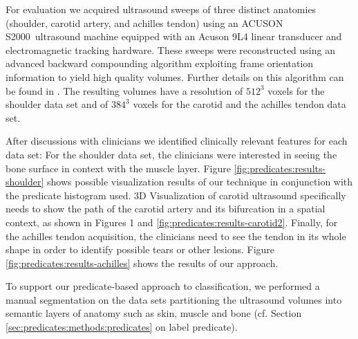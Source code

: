 For evaluation we acquired ultrasound sweeps of three distinct anatomies (shoulder, carotid artery, and achilles tendon) using an ACUSON S2000\texttrademark~ultrasound machine equipped with an Acuson 9L4 linear transducer and electromagnetic tracking hardware. 
These sweeps were reconstructed using an advanced backward compounding algorithm exploiting frame orientation information to yield high quality volumes. 
Further details on this algorithm can be found in \cite{SzB14}.
The resulting volumes have a resolution of $512^3$ voxels for the shoulder data set and of $384^3$ voxels for the carotid and the achilles tendon data set.


After discussions with clinicians we identified clinically relevant features for each data set: For the shoulder data set, the clinicians were interested in seeing the bone surface in context with the muscle layer. 
Figure \ref{fig:predicates:results-shoulder} shows possible visualization results of our technique in conjunction with the predicate histogram used. 
3D Visualization of carotid ultrasound specifically needs to show the path of the carotid artery and its bifurcation in a spatial context, as shown in Figures 1 and \ref{fig:predicates:results-carotid2}. 
Finally, for the achilles tendon acquisition, the clinicians need to see the tendon in its whole shape in order to identify possible tears or other lesions. 
Figure \ref{fig:predicates:results-achilles} shows the results of our approach. 


To support our predicate-based approach to classification, we performed a manual segmentation on the data sets partitioning the ultrasound volumes into semantic layers of anatomy such as skin, muscle and bone (cf. Section \ref{sec:predicates:methods:predicates} on label predicate).


